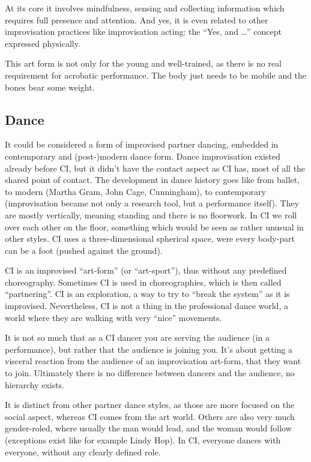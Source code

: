At its core it involves mindfulness, sensing and collecting information which requires full presence and attention.
And yes, it is even related to other improvisation practices like improvisation acting: the ``Yes, and \ldots'' concept expressed physically.

This art form is not only for the young and well-trained, as there is no real requirement for acrobatic performance.
The body just needs to be mobile and the bones bear some weight.

\subsection{Dance}\label{subsec:dance}

It could be considered a form of improvised partner dancing, embedded in contemporary and (post-)modern dance form.
Dance improvisation existed already before CI, but it didn't have the contact aspect as CI has, most of all the shared point of contact.
The development in dance history goes like from ballet, to modern (Martha Gram, John Cage, Cunningham), to contemporary (improvisation became not only a research tool, but a performance itself).
They are mostly vertically, meaning standing and there is no floorwork.
In CI we roll over each other on the floor, something which would be seen as rather unusual in other styles.
CI uses a three-dimensional spherical space, were every body-part can be a foot (pushed against the ground).

CI is an improvised ``art-form'' (or ``art-sport''), thus without any predefined choreography.
Sometimes CI is used in choreographies, which is then called ``partnering''.
CI is an exploration, a way to try to ``break the system'' as it is improvised.
Nevertheless, CI is not a thing in the professional dance world, a world where they are walking with very ``nice'' movements.

It is not so much that as a CI dancer you are serving the audience (in a performance), but rather that the audience is joining you.
It's about getting a visceral reaction from the audience of an improvisation art-form, that they want to join.
Ultimately there is no difference between dancers and the audience, no hierarchy exists.

It is distinct from other partner dance styles, as those are more focused on the social aspect, whereas CI comes from the art world.
Others are also very much gender-roled, where usually the man would lead, and the woman would follow (exceptions exist like for example Lindy Hop).
In CI, everyone dances with everyone, without any clearly defined role.

